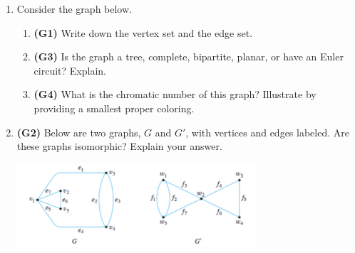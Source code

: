 \documentclass[12pt]{article}
\begin{document}
\begin{enumerate}
\item Consider the graph below.


\begin{enumerate}
    \item \textbf{(G1)} Write down the vertex set and the edge set.
    
    \item \textbf{(G3)} Is the graph a tree, complete, bipartite, planar, or have an Euler circuit? Explain. 
    
    \item \textbf{(G4)} What is the chromatic number of this graph? Illustrate by providing a smallest proper coloring.
    
\end{enumerate}

\item \textbf{(G2)} Below are two graphs, $G$ and $G'$, with vertices and edges labeled. Are these graphs isomorphic? Explain your answer.

\begin{center}
\includegraphics[width=0.7\textwidth]{graphs_picture.png}
\end{center}

\end{enumerate}
\end{document}
